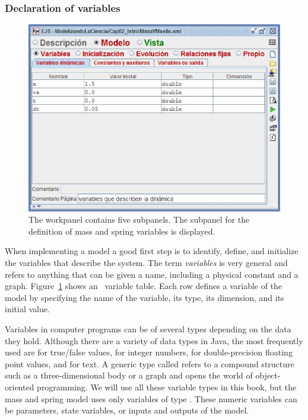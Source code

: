 \subsubsection{Declaration of variables}
\begin{figure}[htb]
    \centering
  \includegraphics[scale=\scale]{02EjsIntro/images/ModelVariables.eps}
    \caption{The  workpanel contains five subpanels. The subpanel for the definition of mass and spring variables is displayed.}
    \label{fig:02EjsIntro/ModelVariables}
\end{figure}

When implementing a model a good first step is to identify, define, and initialize the variables that describe the
system. The term \emph{variables} is very general and refers to anything that can be given a name, including a
physical constant and a graph. Figure~\ref{fig:02EjsIntro/ModelVariables} shows an
\ejs\ variable table. Each row defines a variable of the model by specifying the name of the variable, its type, its dimension, and
its initial value.

Variables in computer programs can be of several types depending on the data they hold. Although there are a variety of
data types in Java, the most frequently used are  for true/false values,  for integer
numbers,  for double-precision floating point values, and  for text. A generic type
called  refers to a compound structure such as a three-dimensional body or a graph and opens the world of object-oriented programming.
We will use all these variable types in this book, but the mass and spring model uses only variables of type .
These numeric variables can be parameters,  state variables, or
inputs and outputs of the model.

